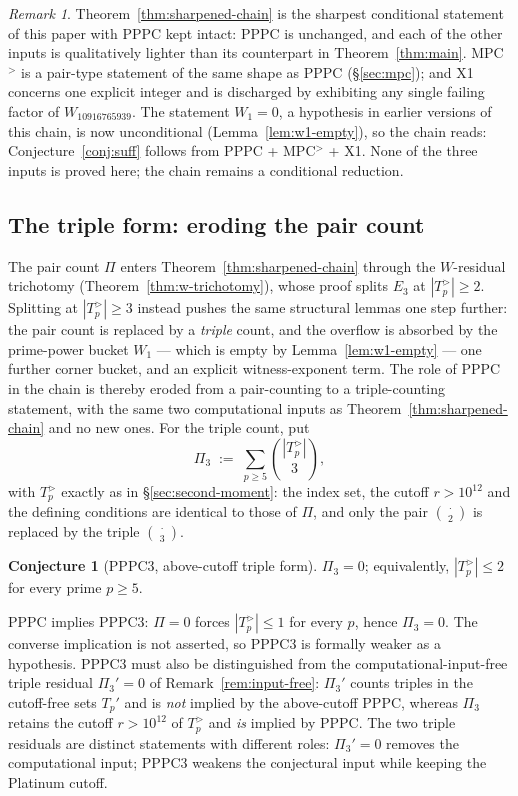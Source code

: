 \documentclass[11pt]{amsart}
\theoremstyle{plain}
\theoremstyle{definition}
\newtheorem{conjecture}[theorem]{Conjecture}
\theoremstyle{remark}
\newtheorem{remark}[theorem]{Remark}
\numberwithin{equation}{section}
\begin{document}
\begin{remark}\label{rem:sharpened-status}
Theorem~\ref{thm:sharpened-chain} is the sharpest conditional statement of this paper with PPPC kept intact: PPPC is unchanged, and each of the other inputs is qualitatively lighter than its counterpart in Theorem~\ref{thm:main}. MPC$^{>}$ is a pair-type statement of the same shape as PPPC (\S\ref{sec:mpc}); and X1 concerns one explicit integer and is discharged by exhibiting any single failing factor of $W_{10916765939}$. The statement $W_1 = 0$, a hypothesis in earlier versions of this chain, is now unconditional (Lemma~\ref{lem:w1-empty}), so the chain reads: Conjecture~\ref{conj:suff} follows from PPPC + MPC$^{>}$ + X1. None of the three inputs is proved here; the chain remains a conditional reduction.
\end{remark}

\subsection{The triple form: eroding the pair count}\label{sec:triple-form}

The pair count $\Pi$ enters Theorem~\ref{thm:sharpened-chain} through the $W$-residual trichotomy (Theorem~\ref{thm:w-trichotomy}), whose proof splits $E_3$ at $|T_p^{>}| \geq 2$. Splitting at $|T_p^{>}| \geq 3$ instead pushes the same structural lemmas one step further: the pair count is replaced by a \emph{triple} count, and the overflow is absorbed by the prime-power bucket $W_1$ --- which is empty by Lemma~\ref{lem:w1-empty} --- one further corner bucket, and an explicit witness-exponent term. The role of PPPC in the chain is thereby eroded from a pair-counting to a triple-counting statement, with the same two computational inputs as Theorem~\ref{thm:sharpened-chain} and no new ones. For the triple count, put
\[
  \Pi_3 \;:=\; \sum_{p \geq 5} \binom{|T_p^{>}|}{3},
\]
with $T_p^{>}$ exactly as in \S\ref{sec:second-moment}: the index set, the cutoff $r > 10^{12}$ and the defining conditions are identical to those of $\Pi$, and only the pair $\binom{\,\cdot\,}{2}$ is replaced by the triple $\binom{\,\cdot\,}{3}$.

\begin{conjecture}[PPPC3, above-cutoff triple form]\label{conj:pppc3}
$\Pi_3 = 0$; equivalently, $|T_p^{>}| \leq 2$ for every prime $p \geq 5$.
\end{conjecture}

PPPC implies PPPC3: $\Pi = 0$ forces $|T_p^{>}| \leq 1$ for every $p$, hence $\Pi_3 = 0$. The converse implication is not asserted, so PPPC3 is formally weaker as a hypothesis. PPPC3 must also be distinguished from the computational-input-free triple residual $\Pi_3' = 0$ of Remark~\ref{rem:input-free}: $\Pi_3'$ counts triples in the cutoff-free sets $T_p'$ and is \emph{not} implied by the above-cutoff PPPC, whereas $\Pi_3$ retains the cutoff $r > 10^{12}$ of $T_p^{>}$ and \emph{is} implied by PPPC. The two triple residuals are distinct statements with different roles: $\Pi_3' = 0$ removes the computational input; PPPC3 weakens the conjectural input while keeping the Platinum cutoff.
\end{document}
